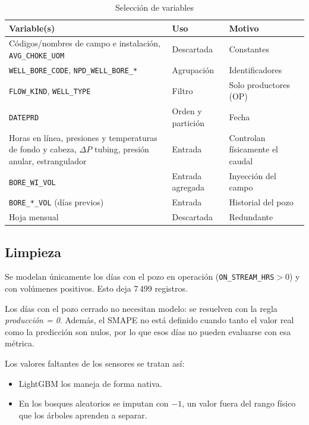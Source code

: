 \documentclass[journal]{IEEEtran}
\begin{document}
\begin{table}[!t]
\centering
\caption{Selección de variables}
\label{tab:vars}
\footnotesize
\begin{tabular}{>{\raggedright\arraybackslash}p{3.3cm}>{\raggedright\arraybackslash}p{1.4cm}>{\raggedright\arraybackslash}p{2.7cm}}
\toprule
\textbf{Variable(s)} & \textbf{Uso} & \textbf{Motivo}\\
\midrule
Códigos/nombres de campo e instalación, \texttt{AVG\_CHOKE\_UOM} & Descartada & Constantes\\
\texttt{WELL\_BORE\_CODE}, \texttt{NPD\_WELL\_BORE\_*} & Agrupación & Identificadores\\
\texttt{FLOW\_KIND}, \texttt{WELL\_TYPE} & Filtro & Solo productores (OP)\\
\texttt{DATEPRD} & Orden y partición & Fecha\\
Horas en línea, presiones y temperaturas de fondo y cabeza, $\Delta P$ tubing, presión anular, estrangulador & Entrada & Controlan físicamente el caudal\\
\texttt{BORE\_WI\_VOL} & Entrada agregada & Inyección del campo\\
\texttt{BORE\_*\_VOL} (días previos) & Entrada & Historial del pozo\\
Hoja mensual & Descartada & Redundante\\
\bottomrule
\end{tabular}
\end{table}

\subsection{Limpieza}
Se modelan únicamente los días con el pozo en operación (\texttt{ON\_STREAM\_HRS}$>0$) y con volúmenes positivos. Esto deja 7\,499 registros.

Los días con el pozo cerrado no necesitan modelo: se resuelven con la regla \emph{producción = 0}. Además, el SMAPE no está definido cuando tanto el valor real como la predicción son nulos, por lo que esos días no pueden evaluarse con esa métrica.

Los valores faltantes de los sensores se tratan así:
\begin{itemize}
\item LightGBM los maneja de forma nativa.
\item En los bosques aleatorios se imputan con $-1$, un valor fuera del rango físico que los árboles aprenden a separar.
\end{itemize}
\end{document}
